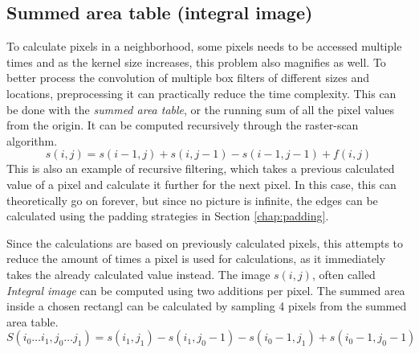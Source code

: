 \documentclass[twoside,a4paper,article]{combine}
\begin{document}
\subsection{Summed area table (integral image)}
To calculate pixels in a neighborhood, some pixels needs to be accessed multiple times and as the kernel size increases, this problem also magnifies as well. To
better process the convolution of multiple box filters of different sizes and locations, preprocessing it can practically reduce the time complexity. 
This can be done with the
\emph{summed area table}, or the running sum of all the pixel values from the origin. It can be computed recursively through the raster-scan algorithm.
\[
    s(i, j) = s(i - 1, j) + s(i, j - 1) - s(i - 1,j - 1) + f(i, j)   
\]
This is also an example of recursive filtering, which takes a previous calculated value of a pixel and calculate it further for the next pixel. In this case, this can theoretically go on forever, but since no picture is infinite,
the edges can be calculated using the padding strategies in Section \ref{chap:padding}.

Since the calculations are based on previously calculated pixels, this attempts to reduce the amount of times a pixel is used for calculations, as it immediately takes the already calculated value
instead. The image $s(i, j)$, often called \emph{Integral image} can be computed using two additions per pixel. The summed area inside a chosen rectangl can be calculated by sampling 4 pixels from the summed area table.
\[
    S(i_0\hdots i_1, j_0\hdots j_1) = s(i_1, j_1) - s(i_1, j_0 - 1) - s(i_0 - 1, j_1) + s(i_0 - 1, j_0 - 1)
\]
 
\end{document}
